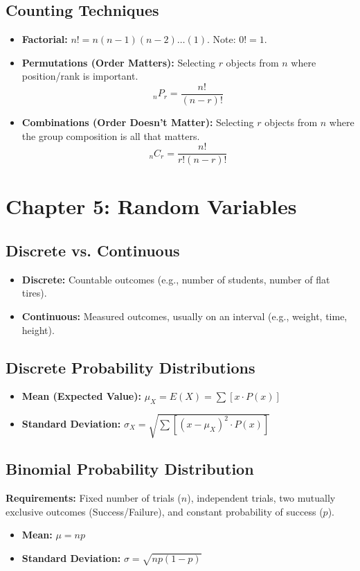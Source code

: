\documentclass[11pt]{article}
\begin{document}
\subsection{Counting Techniques}
\begin{itemize}
    \item \textbf{Factorial:} $n! = n(n-1)(n-2)\dots(1)$. Note: $0! = 1$.
    \item \textbf{Permutations (Order Matters):} Selecting $r$ objects from $n$ where position/rank is important.
    \[ _nP_r = \frac{n!}{(n-r)!} \]
    \item \textbf{Combinations (Order Doesn't Matter):} Selecting $r$ objects from $n$ where the group composition is all that matters.
    \[ _nC_r = \frac{n!}{r!(n-r)!} \]
\end{itemize}

\section{Chapter 5: Random Variables}
\subsection{Discrete vs. Continuous}
\begin{itemize}
    \item \textbf{Discrete:} Countable outcomes (e.g., number of students, number of flat tires).
    \item \textbf{Continuous:} Measured outcomes, usually on an interval (e.g., weight, time, height).
\end{itemize}

\subsection{Discrete Probability Distributions}
\begin{itemize}
    \item \textbf{Mean (Expected Value):} $\mu_X = E(X) = \sum [x \cdot P(x)]$
    \item \textbf{Standard Deviation:} $\sigma_X = \sqrt{\sum [(x - \mu_X)^2 \cdot P(x)]}$
\end{itemize}

\subsection{Binomial Probability Distribution}
\textbf{Requirements:} Fixed number of trials ($n$), independent trials, two mutually exclusive outcomes (Success/Failure), and constant probability of success ($p$).
\begin{itemize}
    \item \textbf{Mean:} $\mu = np$
    \item \textbf{Standard Deviation:} $\sigma = \sqrt{np(1-p)}$
\end{itemize}
\end{document}
